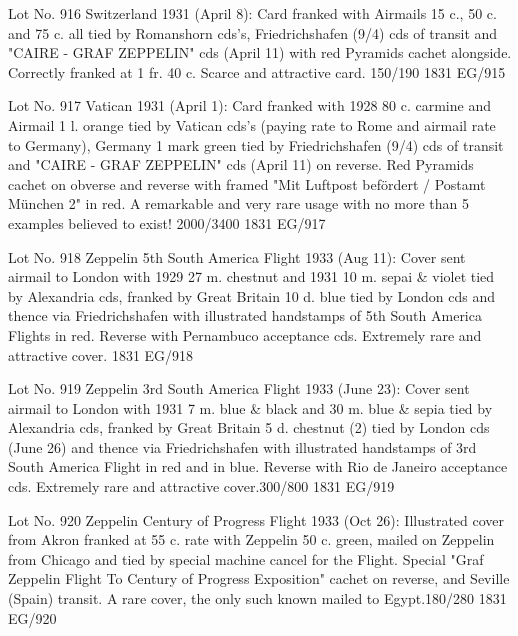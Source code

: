 \documentclass[justified]{tufte-book}
\begin{document}
%
{Lot No. 916
Switzerland 1931 (April 8): Card franked with Airmails 15 c., 50 c. and 75 c. all tied by Romanshorn cds's, Friedrichshafen (9/4) cds of transit and  "CAIRE - GRAF ZEPPELIN" cds (April 11) with red Pyramids cachet alongside. Correctly franked at 1 fr. 40 c. Scarce and attractive card. 150/190}%
{1831}%
{EG/915}%
{}%
{}
{}%
{}


%
{Lot No. 917
Vatican 1931 (April 1): Card franked with 1928 80 c. carmine and Airmail 1 l. orange tied by Vatican cds's (paying rate to Rome and airmail rate to Germany), Germany 1 mark green tied by Friedrichshafen (9/4) cds of transit and "CAIRE - GRAF ZEPPELIN" cds (April 11) on reverse. Red Pyramids cachet on obverse and reverse with framed "Mit Luftpost befördert / Postamt München 2" in red. A remarkable and very rare usage with no more than 5 examples believed to exist! 2000/3400}%
{1831}%
{EG/917}%
{}%
{}
{}%
{}



%
{Lot No. 918
Zeppelin 5th South America Flight 1933 (Aug 11): Cover sent airmail to London with 1929 27 m. chestnut and 1931 10 m. sepai \& violet tied by Alexandria cds, franked by Great Britain 10 d. blue tied by London cds and thence via Friedrichshafen with illustrated handstamps of 5th South America Flights in red. Reverse with Pernambuco acceptance cds. Extremely rare and attractive cover.}%
{1831}%
{EG/918}%
{}%
{}
{}%
{}



%
{Lot No. 919
Zeppelin 3rd South America Flight 1933 (June 23): Cover sent airmail to London with 1931 7 m. blue \& black and 30 m. blue \& sepia tied by Alexandria cds, franked by Great Britain 5 d. chestnut (2) tied by London cds (June 26) and thence via Friedrichshafen with illustrated handstamps of 3rd South America Flight in red and in blue. Reverse with Rio de Janeiro acceptance cds. Extremely rare and attractive cover.300/800}%
{1831}%
{EG/919}%
{}%
{}
{}%
{}

%
{Lot No. 920
Zeppelin Century of Progress Flight 1933 (Oct 26): Illustrated cover from Akron franked at 55 c. rate with Zeppelin 50 c. green, mailed on Zeppelin from Chicago and tied by special machine cancel for the Flight. Special "Graf Zeppelin Flight To Century of Progress Exposition" cachet on reverse, and Seville (Spain) transit. A rare cover, the only such known mailed to Egypt.180/280}%
{1831}%
{EG/920}%
{}%
{}
{}%
{}
\end{document}

